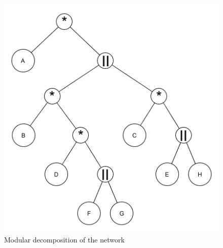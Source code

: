 \documentclass[10pt,a4paper]{article}
\begin{document}
\begin{figure}[H]
	\centering
	\includegraphics[width=0.7\linewidth]{modulardecomposition}
	\caption{Modular decomposition of the network}
	\label{fig:modulardecomposition}
\end{figure}
\end{document}
